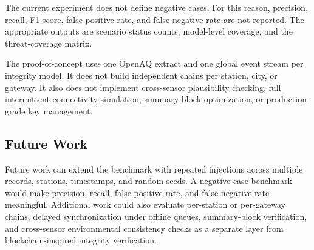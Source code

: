 The current experiment does not define negative cases. For this reason, precision, recall, F1 score, false-positive rate, and false-negative rate are not reported. The appropriate outputs are scenario status counts, model-level coverage, and the threat-coverage matrix.

The proof-of-concept uses one OpenAQ extract and one global event stream per integrity model. It does not build independent chains per station, city, or gateway. It also does not implement cross-sensor plausibility checking, full intermittent-connectivity simulation, summary-block optimization, or production-grade key management.

\subsection{Future Work}

Future work can extend the benchmark with repeated injections across multiple records, stations, timestamps, and random seeds. A negative-case benchmark would make precision, recall, false-positive rate, and false-negative rate meaningful. Additional work could also evaluate per-station or per-gateway chains, delayed synchronization under offline queues, summary-block verification, and cross-sensor environmental consistency checks as a separate layer from blockchain-inspired integrity verification.

